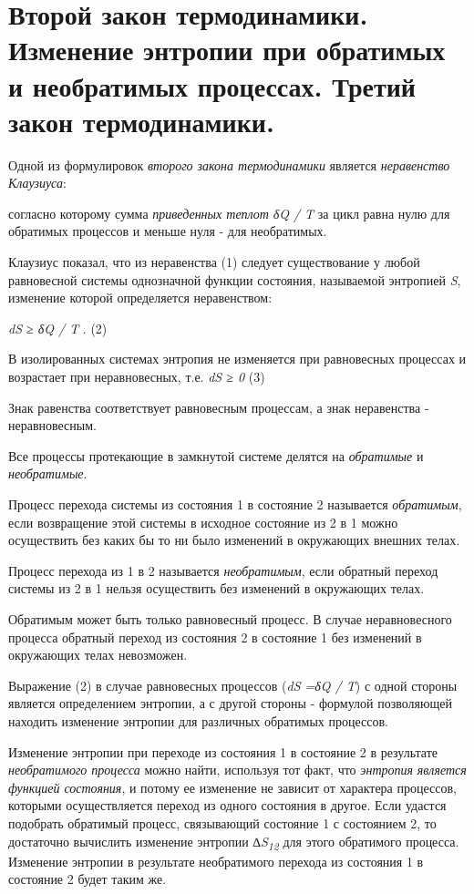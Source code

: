 \chapter{Второй закон термодинамики. Изменение энтропии при
обратимых и необратимых процессах. Третий закон термодинамики.}

Одной из формулировок \emph{второго закона термодинамики} является
\emph{неравенство Клаузиуса}:


согласно которому сумма \emph{приведенных теплот} \emph{δQ / T} за цикл
равна нулю для обратимых процессов и меньше нуля - для необратимых.

Клаузиус показал, что из неравенства (1) следует существование у любой
равновесной системы однозначной функции состояния, называемой энтропией
\emph{S}, изменение которой определяется неравенством:

\emph{dS ≥ δQ / T} . (2)

В изолированных системах энтропия не изменяется при равновесных
процессах и возрастает при неравновесных, т.е. \emph{dS ≥ 0} (3)

Знак равенства соответствует равновесным процессам, а знак неравенства -
неравновесным.

Все процессы протекающие в замкнутой системе делятся на \emph{обратимые}
и \emph{необратимые}.

Процесс перехода системы из состояния 1 в состояние 2 называется
\emph{обратимым}, если возвращение этой системы в исходное состояние из
2 в 1 можно осуществить без каких бы то ни было изменений в окружающих
внешних телах.

Процесс перехода из 1 в 2 называется \emph{необратимым}, если обратный
переход системы из 2 в 1 нельзя осуществить без изменений в окружающих
телах.

Обратимым может быть только равновесный процесс. В случае неравновесного
процесса обратный переход из состояния 2 в состояние 1 без изменений в
окружающих телах невозможен.

Выражение (2) в случае равновесных процессов (\emph{dS =δQ / T}) с одной
стороны является определением энтропии, а с другой стороны - формулой
позволяющей находить изменение энтропии для различных обратимых
процессов.

Изменение энтропии при переходе из состояния 1 в состояние 2 в
результате \emph{необратимого процесса} можно найти, используя тот факт,
что \emph{энтропия} \emph{является функцией состояния}, и потому ее
изменение не зависит от характера процессов, которыми осуществляется
переход из одного состояния в другое. Если удастся подобрать обратимый
процесс, связывающий состояние 1 с состоянием 2, то достаточно вычислить
изменение энтропии \emph{∆S\textsubscript{12}} для этого обратимого
процесса. Изменение энтропии в результате необратимого перехода из
состояния 1 в состояние 2 будет таким же.

